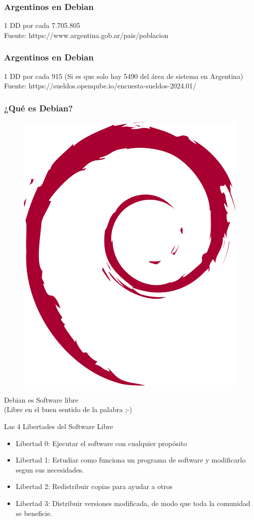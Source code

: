\documentclass{beamer}
\begin{document}
\begin{frame}
  \frametitle{Argentinos en Debian}
  \centering
  \Huge 1 DD por cada 7.705.805
  \vspace{1cm} \\
  \tiny Fuente: https://www.argentina.gob.ar/pais/poblacion
\end{frame}

\begin{frame}
  \frametitle{Argentinos en Debian}
  \centering
  \Huge 1 DD por cada 915  (Si es que solo hay 5490 del área de sistema en
  Argentina)
  \vspace{1cm} \\
  \tiny Fuente: https://sueldos.openqube.io/encuesta-sueldos-2024.01/
\end{frame}

\begin{frame}
  \frametitle{¿Qué es Debian?}
	\begin{figure}
		\centering
		\includegraphics[width=0.5\linewidth]{images/debian}
		\label{fig:debian}
	\end{figure}
\end{frame}

\begin{frame}
  \centering
    \Huge Debian es Software libre\\
    \tiny (Libre en el buen sentido de la palabra ;-)
\end{frame}

\begin{frame}{Las 4 Libertades del Software Libre}
  \begin{itemize}
    \item Libertad 0: Ejecutar el software con cualquier propósito \pause
    \item Libertad 1: Estudiar como funciona un programa de software y
      modificarlo segun sus necesidades. \pause
    \item Libertad 2: Redistribuir copias para ayudar a otros \pause
    \item Libertad 3: Distribuir versiones modificada, de modo que toda la
      comunidad se beneficie.
  \end{itemize}
\end{frame}
\end{document}
